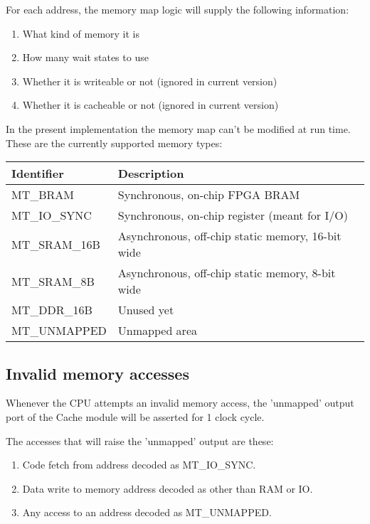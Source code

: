     For each address, the memory map logic will supply the following information:

\begin{enumerate}
    \item What kind of memory it is
    \item How many wait states to use
    \item Whether it is writeable or not (ignored in current version)
    \item Whether it is cacheable or not (ignored in current version)
\end{enumerate}
        
    In the present implementation the memory map can't be modified at run time.\\
    
    These are the currently supported memory types:
    
\begin{tabular}{ll}
\hline
Identifier & Description \\
\hline
MT\_BRAM            & Synchronous, on-chip FPGA BRAM\\
MT\_IO\_SYNC        & Synchronous, on-chip register (meant for I/O)\\
MT\_SRAM\_16B       & Asynchronous, off-chip static memory, 16-bit wide\\
MT\_SRAM\_8B        & Asynchronous, off-chip static memory, 8-bit wide\\
MT\_DDR\_16B        & Unused yet\\
MT\_UNMAPPED        & Unmapped area\\
\hline
\end{tabular}
   
\subsection{Invalid memory accesses}
\label{invalid_memory}

    Whenever the CPU attempts an invalid memory access, the 'unmapped' output 
    port of the Cache module will be asserted for 1 clock cycle.
    
    The accesses that will raise the 'unmapped' output are these:
    
    \begin{enumerate}
    \item Code fetch from address decoded as MT\_IO\_SYNC.
    \item Data write to memory address decoded as other than RAM or IO.
    \item Any access to an address decoded as MT\_UNMAPPED.
    \end{enumerate}
    
